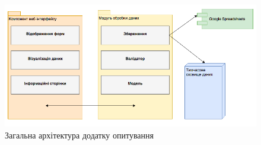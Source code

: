 \begin{figure}[h!]
  \includegraphics[width=\linewidth]{figures/poll_architecture.png}
  \caption{Загальна архітектура додатку опитування}
  \label{fig:poll_architecture}
\end{figure}

